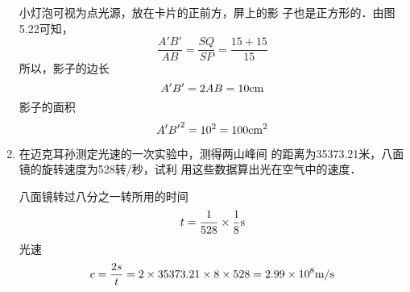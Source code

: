 \begin{enumerate}
\begin{solution}
小灯泡可视为点光源，放在卡片的正前方，屏上的影
子也是正方形的．由图5.22可知，
\[\frac{A'B'}{AB}=\frac{SQ}{SP}=\frac{15+15}{15}\]
所以，影子的边长$$A'B'=2AB=10{\rm cm}$$
影子的面积
$${A'B'}^2=10^2=100{\rm cm^2}$$
\begin{figure}[htp]
	\centering
{}
	\caption{}
\end{figure}
\end{solution}

\item 在迈克耳孙测定光速的一次实验中，测得两山峰间
的距离为35373.21米，八面镜的旋转速度为528转/秒，试利
用这些数据算出光在空气中的速度．

\begin{solution}
八面镜转过八分之一转所用的时间
\[t=\frac{1}{528}\times\frac{1}{8}{\rm s}\]
光速
\[c=\frac{2s}{t}=2\times35373.21\times8\times528=2.99\times10^8\text{m}/\text{s}\]
\end{solution}

\end{enumerate}



